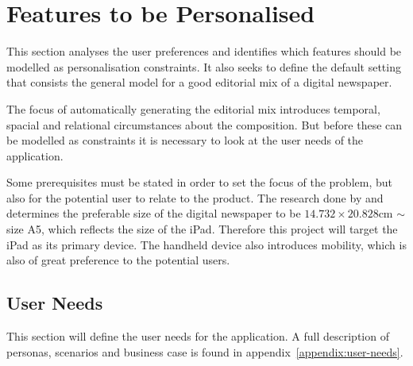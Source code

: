 \chapter{Features to be Personalised} %
\label{ch:analysis}
This section analyses the user preferences and identifies which features should be modelled as personalisation constraints. It also seeks to define the default setting that consists the general model for a good editorial mix of a digital newspaper.

The focus of automatically generating the editorial mix introduces temporal, spacial and relational circumstances about the composition. But before these can be modelled as constraints it is necessary to look at the user needs of the application.
%

Some prerequisites must be stated in order to set the focus of the problem, but also for the potential user to relate to the product. The research done by \cite{FULLTEXT01.pdf} and \cite{kristin_fredrik.pdf} determines the preferable size of the digital newspaper to be $14.732 \times 20.828$cm $\sim$ size A5, which reflects the size of the iPad. Therefore this project will target the iPad as its primary device. The handheld device also introduces mobility, which is also of great preference to the potential users.
%

\section{User Needs}
This section will define the user needs for the application. A full description of personas, scenarios and business case is found in appendix~\vref{appendix:user-needs}.

